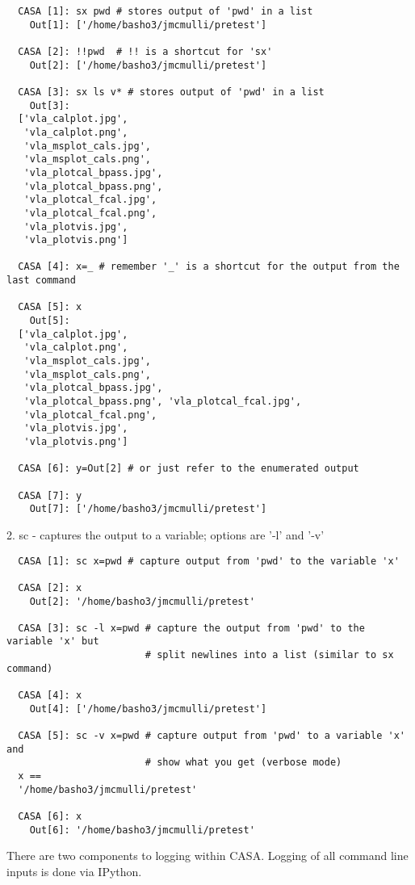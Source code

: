 \small
\begin{verbatim}
  CASA [1]: sx pwd # stores output of 'pwd' in a list
    Out[1]: ['/home/basho3/jmcmulli/pretest']

  CASA [2]: !!pwd  # !! is a shortcut for 'sx'
    Out[2]: ['/home/basho3/jmcmulli/pretest']

  CASA [3]: sx ls v* # stores output of 'pwd' in a list
    Out[3]:
  ['vla_calplot.jpg',
   'vla_calplot.png',
   'vla_msplot_cals.jpg',
   'vla_msplot_cals.png',
   'vla_plotcal_bpass.jpg',
   'vla_plotcal_bpass.png',
   'vla_plotcal_fcal.jpg',
   'vla_plotcal_fcal.png',
   'vla_plotvis.jpg',
   'vla_plotvis.png']

  CASA [4]: x=_ # remember '_' is a shortcut for the output from the last command

  CASA [5]: x
    Out[5]:
  ['vla_calplot.jpg',
   'vla_calplot.png',
   'vla_msplot_cals.jpg',
   'vla_msplot_cals.png',
   'vla_plotcal_bpass.jpg',
   'vla_plotcal_bpass.png', 'vla_plotcal_fcal.jpg',
   'vla_plotcal_fcal.png',
   'vla_plotvis.jpg',
   'vla_plotvis.png']

  CASA [6]: y=Out[2] # or just refer to the enumerated output

  CASA [7]: y
    Out[7]: ['/home/basho3/jmcmulli/pretest']
\end{verbatim}
\normalsize

2. sc - captures the output to a variable; options are '-l' and '-v' 

\small
\begin{verbatim}
  CASA [1]: sc x=pwd # capture output from 'pwd' to the variable 'x'

  CASA [2]: x
    Out[2]: '/home/basho3/jmcmulli/pretest'

  CASA [3]: sc -l x=pwd # capture the output from 'pwd' to the variable 'x' but
                        # split newlines into a list (similar to sx command)

  CASA [4]: x
    Out[4]: ['/home/basho3/jmcmulli/pretest']

  CASA [5]: sc -v x=pwd # capture output from 'pwd' to a variable 'x' and
                        # show what you get (verbose mode)
  x ==
  '/home/basho3/jmcmulli/pretest'
  
  CASA [6]: x
    Out[6]: '/home/basho3/jmcmulli/pretest'
\end{verbatim}
\normalsize

\vspace{3mm}

There are two components to logging within CASA. Logging of all
command line inputs is done via IPython. 

